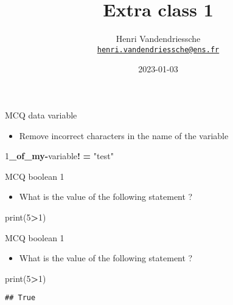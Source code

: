 \documentclass[
  8pt,
  ignorenonframetext,
]{beamer}
\title{Extra class 1}
\author{Henri Vandendriessche\\
\href{mailto:henri.vandendriessche@ens.fr}{\nolinkurl{henri.vandendriessche@ens.fr}}}
\date{2023-01-03}
\newenvironment{Shaded}{\begin{snugshade}}{\end{snugshade}}
\newcommand{\BuiltInTok}[1]{#1}
\newcommand{\DecValTok}[1]{\textcolor[rgb]{0.00,0.00,0.81}{#1}}
\newcommand{\ErrorTok}[1]{\textcolor[rgb]{0.64,0.00,0.00}{\textbf{#1}}}
\newcommand{\NormalTok}[1]{#1}
\newcommand{\OperatorTok}[1]{\textcolor[rgb]{0.81,0.36,0.00}{\textbf{#1}}}
\newcommand{\StringTok}[1]{\textcolor[rgb]{0.31,0.60,0.02}{#1}}
\providecommand{\tightlist}{%
  \setlength{\itemsep}{0pt}\setlength{\parskip}{0pt}}
\begin{document}
\frame{\titlepage}

\begin{frame}[fragile]{MCQ data variable}
\protect\hypertarget{mcq-data-variable}{}
\begin{itemize}
\tightlist
\item
  Remove incorrect characters in the name of the variable
\end{itemize}

\begin{Shaded}
\begin{Highlighting}[]
\DecValTok{1}\ErrorTok{\_of\_my}\OperatorTok{{-}}\NormalTok{variable}\OperatorTok{!} \OperatorTok{=} \StringTok{"test"}
\end{Highlighting}
\end{Shaded}
\end{frame}

\begin{frame}[fragile]{MCQ boolean 1}
\protect\hypertarget{mcq-boolean-1}{}
\begin{itemize}
\tightlist
\item
  What is the value of the following statement ?
\end{itemize}

\begin{Shaded}
\begin{Highlighting}[]
\BuiltInTok{print}\NormalTok{(}\DecValTok{5}\OperatorTok{\textgreater{}}\DecValTok{1}\NormalTok{)}
\end{Highlighting}
\end{Shaded}
\end{frame}

\begin{frame}[fragile]{MCQ boolean 1}
\protect\hypertarget{mcq-boolean-1-1}{}
\begin{itemize}
\tightlist
\item
  What is the value of the following statement ?
\end{itemize}

\begin{Shaded}
\begin{Highlighting}[]
\BuiltInTok{print}\NormalTok{(}\DecValTok{5}\OperatorTok{\textgreater{}}\DecValTok{1}\NormalTok{)}
\end{Highlighting}
\end{Shaded}

\begin{verbatim}
## True
\end{verbatim}
\end{frame}
\end{document}
